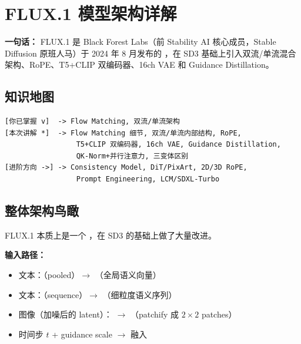 

\section{FLUX.1 模型架构详解}

\begin{conceptbox}
\textbf{一句话：} FLUX.1 是 Black Forest Labs（前 Stability AI 核心成员，Stable Diffusion 原班人马）于 2024 年 8 月发布的 ，在 SD3 基础上引入双流/单流混合架构、RoPE、T5+CLIP 双编码器、16ch VAE 和 Guidance Distillation。
\end{conceptbox}

\subsection{知识地图}

\begin{lstlisting}
[你已掌握 v]  -> Flow Matching, 双流/单流架构
[本次讲解 *]  -> Flow Matching 细节, 双流/单流内部结构, RoPE,
                 T5+CLIP 双编码器, 16ch VAE, Guidance Distillation,
                 QK-Norm+并行注意力, 三变体区别
[进阶方向 ->] -> Consistency Model, DiT/PixArt, 2D/3D RoPE,
                 Prompt Engineering, LCM/SDXL-Turbo
\end{lstlisting}

\subsection{整体架构鸟瞰}

\begin{conceptbox}
FLUX.1 本质上是一个 ，在 SD3 的基础上做了大量改进。
\end{conceptbox}

\textbf{输入路径：}

\begin{itemize}[leftmargin=1.5em]
  \item 文本：（pooled）$\to$ （全局语义向量）
  \item 文本：（sequence）$\to$ （细粒度语义序列）
  \item 图像（加噪后的 latent）： $\to$ （patchify 成 $2\times2$ patches）
  \item 时间步 $t$ + guidance scale $\to$ 融入 
\end{itemize}

